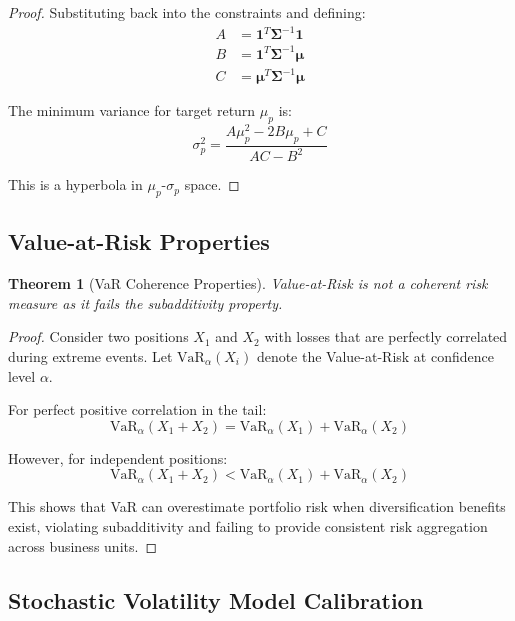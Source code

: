 \documentclass[12pt,a4paper]{article}
\newtheorem{theorem}{Theorem}[section]
\theoremstyle{definition}
\theoremstyle{remark}
\begin{document}
\begin{appendices}
\begin{proof}
Substituting back into the constraints and defining:
\begin{align}
A &= \mathbf{1}^T\boldsymbol{\Sigma}^{-1}\mathbf{1}\\
B &= \mathbf{1}^T\boldsymbol{\Sigma}^{-1}\boldsymbol{\mu}\\
C &= \boldsymbol{\mu}^T\boldsymbol{\Sigma}^{-1}\boldsymbol{\mu}
\end{align}

The minimum variance for target return $\mu_p$ is:
\begin{equation}
\sigma_p^2 = \frac{A\mu_p^2 - 2B\mu_p + C}{AC - B^2}
\end{equation}

This is a hyperbola in $\mu_p$-$\sigma_p$ space.
\end{proof}

\subsection{Value-at-Risk Properties}

\begin{theorem}[VaR Coherence Properties]
\label{thm:var_properties}
Value-at-Risk is not a coherent risk measure as it fails the subadditivity property.
\end{theorem}

\begin{proof}
Consider two positions $X_1$ and $X_2$ with losses that are perfectly correlated during extreme events. Let $\text{VaR}_{\alpha}(X_i)$ denote the Value-at-Risk at confidence level $\alpha$.

For perfect positive correlation in the tail:
\begin{equation}
\text{VaR}_{\alpha}(X_1 + X_2) = \text{VaR}_{\alpha}(X_1) + \text{VaR}_{\alpha}(X_2)
\end{equation}

However, for independent positions:
\begin{equation}
\text{VaR}_{\alpha}(X_1 + X_2) < \text{VaR}_{\alpha}(X_1) + \text{VaR}_{\alpha}(X_2)
\end{equation}

This shows that VaR can overestimate portfolio risk when diversification benefits exist, violating subadditivity and failing to provide consistent risk aggregation across business units.
\end{proof}

\subsection{Stochastic Volatility Model Calibration}


\end{appendices}
\end{document}
